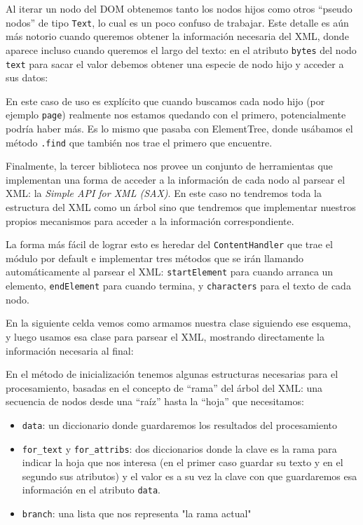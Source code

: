 Al iterar un nodo del DOM obtenemos tanto los nodos hijos como otros ``pseudo nodos'' de tipo \texttt{Text}, lo cual es un poco confuso de trabajar. Este detalle es aún más notorio cuando queremos obtener la información necesaria del XML, donde aparece incluso cuando queremos el largo del texto: en el atributo \texttt{bytes} del nodo \texttt{text} para sacar el valor debemos obtener una especie de nodo hijo y acceder a sus datos:


En este caso de uso es explícito que cuando buscamos cada nodo hijo (por ejemplo \texttt{page}) realmente nos estamos quedando con el primero, potencialmente podría haber más. Es lo mismo que pasaba con ElementTree, donde usábamos el método \texttt{.find} que también nos trae el primero que encuentre.

Finalmente, la tercer biblioteca nos provee un conjunto de herramientas que implementan una forma de acceder a la información de cada nodo al parsear el XML: la \textit{Simple API for XML (SAX)}. En este caso no tendremos toda la estructura del XML como un árbol sino que tendremos que implementar nuestros propios mecanismos para acceder a la información correspondiente.

La forma más fácil de lograr esto es heredar del \texttt{ContentHandler} que trae el módulo por default e implementar tres métodos que se irán llamando automáticamente al parsear el XML: \texttt{startElement} para cuando arranca un elemento, \texttt{endElement} para cuando termina, y \texttt{characters} para el texto de cada nodo.

En la siguiente celda vemos como armamos nuestra clase siguiendo ese esquema, y luego usamos esa clase para parsear el XML, mostrando directamente la información necesaria al final:


En el método de inicialización tenemos algunas estructuras necesarias para el procesamiento, basadas en el concepto de ``rama'' del árbol del XML: una secuencia de nodos desde una ``raíz'' hasta la ``hoja'' que necesitamos:

\begin{itemize}
    \item \texttt{data}: un diccionario donde guardaremos los resultados del procesamiento
    \item \texttt{for\_text} y \texttt{for\_attribs}: dos diccionarios donde la clave es la rama para indicar la hoja que nos interesa (en el primer caso guardar su texto y en el segundo sus atributos) y el valor es a su vez la clave con que guardaremos esa información en el atributo \texttt{data}.
    \item \texttt{branch}: una lista que nos representa "la rama actual"
\end{itemize}


